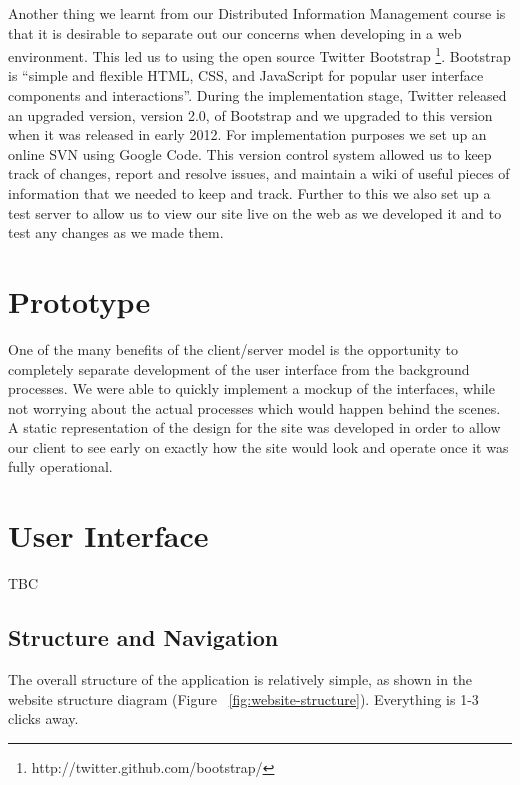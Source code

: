 \documentclass{l3proj}
\begin{document}
Another thing we learnt from our Distributed Information Management course is
that it is desirable to separate out our concerns when developing in a web
environment. This led us to using the open source Twitter Bootstrap
\footnote{http://twitter.github.com/bootstrap/}. Bootstrap is ``simple and
flexible HTML, CSS, and JavaScript for popular user interface components and
interactions''. During the implementation stage, Twitter released an upgraded version,
version 2.0, of Bootstrap and we upgraded to this version when it was released
in early 2012.\newline
\newline
For implementation purposes we set up an online
SVN using Google Code. This version control system allowed us to keep track of
changes, report and resolve issues, and maintain a wiki of useful pieces of
information that we needed to keep and track.\newline
\newline Further to this we also set up a test server to allow us to view our site live on the web as we
developed it and to test any changes as we made them.\newline
\newline

\section{Prototype} \label{sect:proto}
One of the many benefits of the client/server model is the opportunity to
completely separate development of the user interface from the background
processes. 
We were able to quickly implement a mockup of the interfaces, while not worrying
about the actual processes which would happen behind the scenes. A static
representation of the design for the site was developed in order to allow our
client to see early on exactly how the site would look and operate once it was
fully operational.

\section{User Interface} \label{sect:ui} 
TBC

\subsection{Structure and Navigation}

The overall structure of the application is relatively simple, as shown 
in the website structure diagram (Figure ~\ref{fig:website-structure}). 
Everything is 1-3 clicks away.
\end{document}
